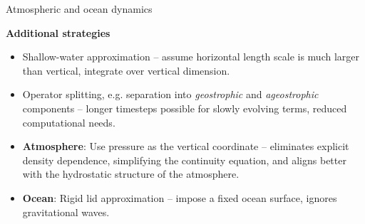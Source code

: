 \documentclass[aspectratio=169,xcolor=dvipsnames]{beamer}
\begin{document}
\begin{frame}[t]{Atmospheric and ocean dynamics}
\center

\vspace{-1.0em}

\textbf{{\large
Additional strategies
}}

\small 

\vspace{2.0em}

\begin{itemize}
    \item Shallow-water approximation -- assume horizontal length scale is much larger than vertical, integrate over vertical dimension.
    \item Operator splitting, e.g. separation into \emph{geostrophic} and \emph{ageostrophic} components -- longer timesteps possible for slowly evolving terms, reduced computational needs.
    \newline
    \item \textbf{Atmosphere}: Use pressure as the vertical coordinate -- eliminates explicit density dependence, simplifying the continuity equation, and aligns better with the hydrostatic structure of the atmosphere.
    \item \textbf{Ocean}: Rigid lid approximation -- impose a fixed ocean surface, ignores gravitational waves.
\end{itemize}
\end{frame}
\end{document}
